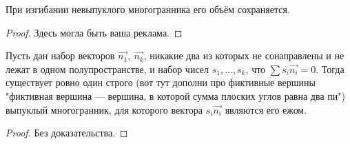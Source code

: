 \begin{theorem}[Сабитов]
    При изгибании невыпуклого многогранника его объём сохраняется.
\end{theorem}
\begin{proof}
    Здесь могла быть ваша реклама.
\end{proof}

\begin{theorem}[Минковский]
    Пусть дан набор векторов $\overrightarrow{n_1}, \ \overrightarrow{n_k}$, никакие два из которых не сонаправлены и не лежат в одном полупространстве, и набор чисел $s_1, \dots, s_k$, что $\sum s_i \overrightarrow{n_i} = 0$. Тогда существует ровно один строго (вот тут дополни про фиктивные вершины "фиктивная вершина — вершина, в которой сумма плоских углов равна два пи") выпуклый многогранник, для которого вектора $s_i \overrightarrow{n_i}$ являются его ежом.
\end{theorem}
\begin{proof}
    Без доказательства.
\end{proof}